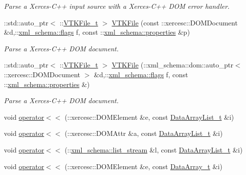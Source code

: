 \begin{DoxyCompactItemize}
\begin{DoxyCompactList}\small\item\em Parse a Xerces-\/\+C++ input source with a Xerces-\/\+C++ D\+O\+M error handler. \end{DoxyCompactList}\item 
\+::std\+::auto\+\_\+ptr$<$ \+::\hyperlink{classVTKFile__t}{V\+T\+K\+File\+\_\+t} $>$ \hyperlink{vtk-unstructured_8cpp_a5cfc26d05bba2c6e23c17478e8178ddb}{V\+T\+K\+File} (const \+::xercesc\+::\+D\+O\+M\+Document \&d,\+::\hyperlink{namespacexml__schema_a8d981c127a1f5106d04ad5853e707361}{xml\+\_\+schema\+::flags} f, const \+::\hyperlink{namespacexml__schema_aba199bc39c8b21c427369c27d2bcfc8c}{xml\+\_\+schema\+::properties} \&p)
\begin{DoxyCompactList}\small\item\em Parse a Xerces-\/\+C++ D\+O\+M document. \end{DoxyCompactList}\item 
\+::std\+::auto\+\_\+ptr$<$ \+::\hyperlink{classVTKFile__t}{V\+T\+K\+File\+\_\+t} $>$ \hyperlink{vtk-unstructured_8cpp_a47eb5ec0aafb0ac2a5cd332db8f6a8af}{V\+T\+K\+File} (\+::xml\+\_\+schema\+::dom\+::auto\+\_\+ptr$<$ \+::xercesc\+::\+D\+O\+M\+Document $>$ \&d,\+::\hyperlink{namespacexml__schema_a8d981c127a1f5106d04ad5853e707361}{xml\+\_\+schema\+::flags} f, const \+::\hyperlink{namespacexml__schema_aba199bc39c8b21c427369c27d2bcfc8c}{xml\+\_\+schema\+::properties} \&)
\begin{DoxyCompactList}\small\item\em Parse a Xerces-\/\+C++ D\+O\+M document. \end{DoxyCompactList}\item 
void \hyperlink{vtk-unstructured_8cpp_a61ab4b44692dc25fbed88bd01294b3a6}{operator$<$$<$} (\+::xercesc\+::\+D\+O\+M\+Element \&e, const \hyperlink{classDataArrayList__t}{Data\+Array\+List\+\_\+t} \&i)
\item 
void \hyperlink{vtk-unstructured_8cpp_a7630c2ebfb09fec59ec9744ab4de05a1}{operator$<$$<$} (\+::xercesc\+::\+D\+O\+M\+Attr \&a, const \hyperlink{classDataArrayList__t}{Data\+Array\+List\+\_\+t} \&i)
\item 
void \hyperlink{vtk-unstructured_8cpp_a15e37609fa21b26bacce23662c522124}{operator$<$$<$} (\+::\hyperlink{namespacexml__schema_ab6c818ac91e70a25620375e0d000be83}{xml\+\_\+schema\+::list\+\_\+stream} \&l, const \hyperlink{classDataArrayList__t}{Data\+Array\+List\+\_\+t} \&i)
\item 
void \hyperlink{vtk-unstructured_8cpp_a90ac4d883593f3e71cc24b0c8a53f745}{operator$<$$<$} (\+::xercesc\+::\+D\+O\+M\+Element \&e, const \hyperlink{classDataArray__t}{Data\+Array\+\_\+t} \&i)

\end{DoxyCompactItemize}
